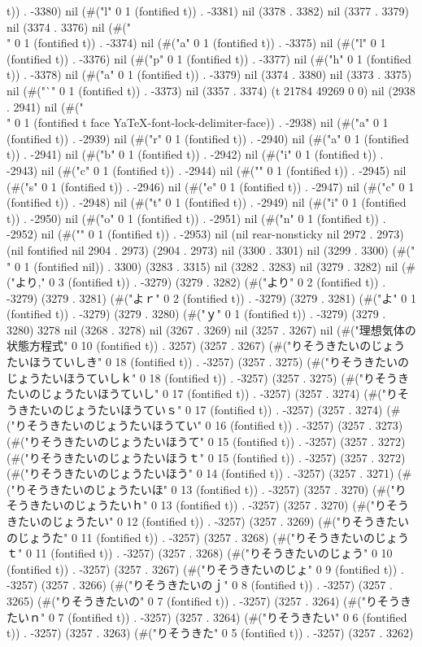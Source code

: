 t)) . -3380) nil (#("l" 0 1 (fontified t)) . -3381) nil (3378 . 3382) nil (3377 . 3379) nil (3374 . 3376) nil (#("\\" 0 1 (fontified t)) . -3374) nil (#("a" 0 1 (fontified t)) . -3375) nil (#("l" 0 1 (fontified t)) . -3376) nil (#("p" 0 1 (fontified t)) . -3377) nil (#("h" 0 1 (fontified t)) . -3378) nil (#("a" 0 1 (fontified t)) . -3379) nil (3374 . 3380) nil (3373 . 3375) nil (#("`" 0 1 (fontified t)) . -3373) nil (3357 . 3374) (t 21784 49269 0 0) nil (2938 . 2941) nil (#("\\" 0 1 (fontified t face YaTeX-font-lock-delimiter-face)) . -2938) nil (#("a" 0 1 (fontified t)) . -2939) nil (#("r" 0 1 (fontified t)) . -2940) nil (#("a" 0 1 (fontified t)) . -2941) nil (#("b" 0 1 (fontified t)) . -2942) nil (#("i" 0 1 (fontified t)) . -2943) nil (#("c" 0 1 (fontified t)) . -2944) nil (#("{" 0 1 (fontified t)) . -2945) nil (#("s" 0 1 (fontified t)) . -2946) nil (#("e" 0 1 (fontified t)) . -2947) nil (#("c" 0 1 (fontified t)) . -2948) nil (#("t" 0 1 (fontified t)) . -2949) nil (#("i" 0 1 (fontified t)) . -2950) nil (#("o" 0 1 (fontified t)) . -2951) nil (#("n" 0 1 (fontified t)) . -2952) nil (#("}" 0 1 (fontified t)) . -2953) nil (nil rear-nonsticky nil 2972 . 2973) (nil fontified nil 2904 . 2973) (2904 . 2973) nil (3300 . 3301) nil (3299 . 3300) (#(" " 0 1 (fontified nil)) . 3300) (3283 . 3315) nil (3282 . 3283) nil (3279 . 3282) nil (#("より," 0 3 (fontified t)) . -3279) (3279 . 3282) (#("より" 0 2 (fontified t)) . -3279) (3279 . 3281) (#("よｒ" 0 2 (fontified t)) . -3279) (3279 . 3281) (#("よ" 0 1 (fontified t)) . -3279) (3279 . 3280) (#("ｙ" 0 1 (fontified t)) . -3279) (3279 . 3280) 3278 nil (3268 . 3278) nil (3267 . 3269) nil (3257 . 3267) nil (#("理想気体の状態方程式" 0 10 (fontified t)) . 3257) (3257 . 3267) (#("りそうきたいのじょうたいほうていしき" 0 18 (fontified t)) . -3257) (3257 . 3275) (#("りそうきたいのじょうたいほうていしｋ" 0 18 (fontified t)) . -3257) (3257 . 3275) (#("りそうきたいのじょうたいほうていし" 0 17 (fontified t)) . -3257) (3257 . 3274) (#("りそうきたいのじょうたいほうていｓ" 0 17 (fontified t)) . -3257) (3257 . 3274) (#("りそうきたいのじょうたいほうてい" 0 16 (fontified t)) . -3257) (3257 . 3273) (#("りそうきたいのじょうたいほうて" 0 15 (fontified t)) . -3257) (3257 . 3272) (#("りそうきたいのじょうたいほうｔ" 0 15 (fontified t)) . -3257) (3257 . 3272) (#("りそうきたいのじょうたいほう" 0 14 (fontified t)) . -3257) (3257 . 3271) (#("りそうきたいのじょうたいほ" 0 13 (fontified t)) . -3257) (3257 . 3270) (#("りそうきたいのじょうたいｈ" 0 13 (fontified t)) . -3257) (3257 . 3270) (#("りそうきたいのじょうたい" 0 12 (fontified t)) . -3257) (3257 . 3269) (#("りそうきたいのじょうた" 0 11 (fontified t)) . -3257) (3257 . 3268) (#("りそうきたいのじょうｔ" 0 11 (fontified t)) . -3257) (3257 . 3268) (#("りそうきたいのじょう" 0 10 (fontified t)) . -3257) (3257 . 3267) (#("りそうきたいのじょ" 0 9 (fontified t)) . -3257) (3257 . 3266) (#("りそうきたいのｊ" 0 8 (fontified t)) . -3257) (3257 . 3265) (#("りそうきたいの" 0 7 (fontified t)) . -3257) (3257 . 3264) (#("りそうきたいｎ" 0 7 (fontified t)) . -3257) (3257 . 3264) (#("りそうきたい" 0 6 (fontified t)) . -3257) (3257 . 3263) (#("りそうきた" 0 5 (fontified t)) . -3257) (3257 . 3262) 